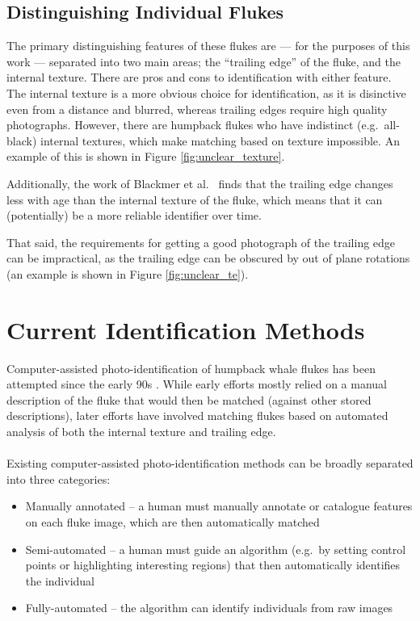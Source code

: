 \subsection{Distinguishing Individual Flukes}

The primary distinguishing features of these flukes are --- for the purposes of this work --- separated into two main areas; the ``trailing edge'' of the fluke, and the internal texture.
There are pros and cons to identification with either feature.
The internal texture is a more obvious choice for identification, as it is disinctive even from a distance and blurred, whereas trailing edges require high quality photographs.
However, there are humpback flukes who have indistinct (e.g.\ all-black) internal textures, which make matching based on texture impossible.
An example of this is shown in Figure \ref{fig:unclear_texture}.

Additionally, the work of Blackmer et al.\ \cite{blackmer2000temporal} finds that the trailing edge changes less with age than the internal texture of the fluke, which means that it can (potentially) be a more reliable identifier over time.

That said, the requirements for getting a good photograph of the trailing edge can be impractical, as the trailing edge can be obscured by out of plane rotations (an example is shown in Figure \ref{fig:unclear_te}).


\section{Current Identification Methods}

Computer-assisted photo-identification of humpback whale flukes has been attempted since the early 90s \cite{mizroch1990computer}.
While early efforts mostly relied on a manual description of the fluke that would then be matched (against other stored descriptions), later efforts have involved matching flukes based on automated analysis of both the internal texture and trailing edge.
\\\\
Existing computer-assisted photo-identification methods can be broadly separated into three categories:

\begin{itemize}
	\item Manually annotated -- a human must manually annotate or catalogue features on each fluke image, which are then automatically matched
	\item Semi-automated -- a human must guide an algorithm (e.g.\ by setting control points or highlighting interesting regions) that then automatically identifies the individual
	\item Fully-automated -- the algorithm can identify individuals from raw images
\end{itemize}

